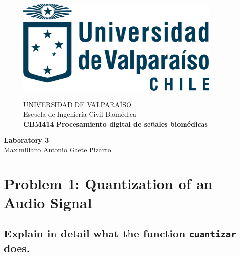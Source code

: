 \documentclass[10pt]{article}
\theoremstyle{definition}
\theoremstyle{remark}
\theoremstyle{definition}
\numberwithin{equation}{prob}
\begin{document}
	
	\begin{titlepage}
		
		
		\begin{figure}
			\begin{minipage}{4cm}
				\includegraphics[width=0.9\textwidth]{./figures/logo}
			\end{minipage}
			\begin{minipage}{11cm}
				\vspace{4mm}
				{\sc UNIVERSIDAD DE VALPARAÍSO}\\
				Escuela de Ingeniería Civil Biomédica\\
				{\bf CBM414 Procesamiento digital de señales biomédicas}\\
				\vspace{0mm}
				\hrulefill
			\end{minipage}
		\end{figure}
		\phantom{""}\vspace{60mm}
		
		
		\begin{center}
			\Huge{\textbf{Laboratory 3}}\vspace{95mm}\\
			\raggedleft \Large{Maximiliano Antonio Gaete Pizarro}\\ 
		\end{center}
		
		
	\end{titlepage}
	
\printindex


\section{Problem 1: Quantization of an Audio Signal}

\subsection{Explain in detail what the function \texttt{cuantizar} does.}
\end{document}
